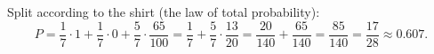 Split according to the shirt (the law of total probability):
\[P=\dfrac{1}{7}\cdot1+\dfrac{1}{7}\cdot0+\dfrac{5}{7}\cdot\dfrac{65}{100}=\dfrac{1}{7}+\dfrac{5}{7}\cdot\dfrac{13}{20}=\dfrac{20}{140}+\dfrac{65}{140}=\dfrac{85}{140}=\boxed{\dfrac{17}{28}}\approx0.607 .\]
